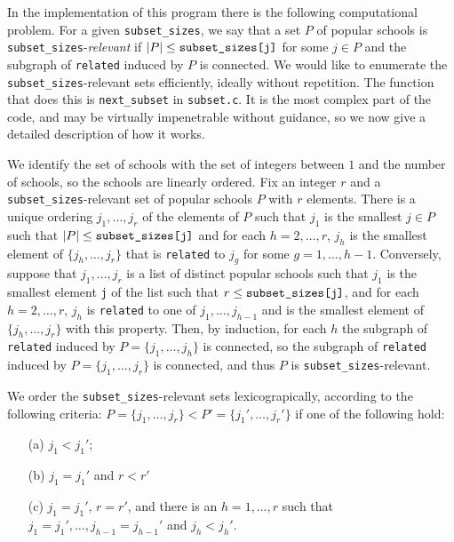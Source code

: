 \documentclass[12pt]{article}
\theoremstyle{definition}
\begin{document}
In the implementation of this program there is the following
computational problem.  For a given \texttt{subset\_sizes}, we say
that a set $P$ of popular schools is
\texttt{subset\_sizes}-\emph{relevant} if $|P| \le
\text{\texttt{subset\_sizes[j]}}$ for some $j \in P$ and the subgraph
of \texttt{related} induced by $P$ is connected.  We would like to
enumerate the \texttt{subset\_sizes}-relevant sets efficiently,
ideally without repetition.  The function that does this is
\texttt{next\_subset} in \texttt{subset.c}. It is the most complex
part of the code, and may be virtually impenetrable without guidance,
so we now give a detailed description of how it works.

We identify the set of schools with the set of integers between $1$
and the number of schools, so the schools are linearly ordered.  Fix
an integer $r$ and a \texttt{subset\_sizes}-relevant set of popular
schools $P$ with $r$ elements.  There is a unique ordering $j_1,
\ldots, j_r$ of the elements of $P$ such that $j_1$ is the smallest $j
\in P$ such that $|P| \le \text{\texttt{subset\_sizes[j]}}$ and for
each $h = 2, \ldots, r$, $j_h$ is the smallest element of $\{j_h,
\ldots, j_r\}$ that is \texttt{related} to $j_g$ for some $g = 1,
\ldots, h-1$.  Conversely, suppose that $j_1, \ldots, j_r$ is a list
of distinct popular schools such that $j_1$ is the smallest element
\texttt{j} of the list such that $r \le
\text{\texttt{subset\_sizes[j]}}$, and for each $h = 2, \ldots, r$,
$j_h$ is \texttt{related} to one of $j_1, \ldots, j_{h-1}$ and is the
smallest element of $\{j_h, \ldots, j_r\}$ with this property.  Then,
by induction, for each $h$ the subgraph of \texttt{related} induced by
$P = \{j_1, \ldots, j_h\}$ is connected, so the subgraph of
\texttt{related} induced by $P = \{j_1, \ldots, j_r\}$ is connected,
and thus $P$ is \texttt{subset\_sizes}-relevant.

We order the \texttt{subset\_sizes}-relevant sets lexicograpically,
according to the following criteria: $P = \{j_1, \ldots, j_r\} < P' =
\{j_1', \ldots, j_r'\}$ if one of the following hold:
\begin{enumerate}
  \item[(a)] $j_1 < j_1'$;
  \item[(b)] $j_1 = j_1'$ and $r < r'$
  \item[(c)] $j_1 = j_1'$, $r = r'$, and there is an $h = 1, \ldots,
    r$ such that $j_1 = j_1', \ldots, j_{h-1} = j_{h-1}'$ and $j_h <
    j_h'$.
\end{enumerate}
\end{document}
